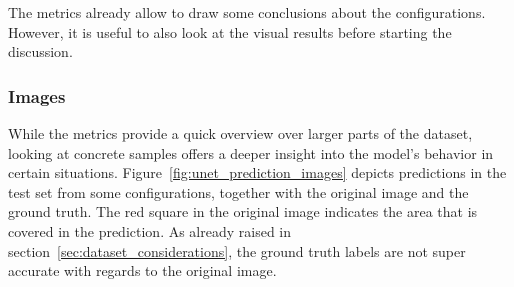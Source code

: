 The metrics already allow to draw some conclusions about the configurations. However, it is useful to also look at the visual results before starting the discussion.

\subsubsection{Images}
While the metrics provide a quick overview over larger parts of the dataset, looking at concrete samples offers a deeper insight into the model's behavior in certain situations. Figure~\ref{fig:unet_prediction_images} depicts predictions in the test set from some configurations, together with the original image and the ground truth. The red square in the original image indicates the area that is covered in the prediction. As already raised in section~\ref{sec:dataset_considerations}, the ground truth labels are not super accurate with regards to the original image.

